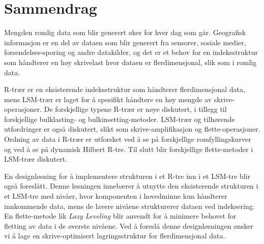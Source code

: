 \chapter*{Sammendrag}

Mengden romlig data som blir generert øker for hver dag som går. Geografisk informasjon er en del av dataen som blir generert fra sensorer, sosiale medier, forsendelses-sporing og andre datakilder, og det er et behov for en indeksstruktur som håndterer en høy skrivelast hvor dataen er flerdimensjonal, slik som i romlig data.\newline

\noindent
R-trær er en eksisterende indeksstruktur som håndterer flerdimensjonal data, mens LSM-trær er laget for å spesifikt håndtere en høy mengde av skrive-operasjoner. De forskjellige typene R-trær er nøye diskutert, i tillegg til forskjellige bulklasting- og bulkinsetting-metoder. LSM-trær og tilhørende utfordringer er også diskutert, slikt som skrive-amplifikasjon og flette-operasjoner. Ordning av data i R-trær er utforsket ved å se på forskjellige romfyllingskurver og ved å se på dynamisk Hilbert R-tre. Til slutt blir forskjellige flette-metoder i LSM-trær diskutert.\newline

\noindent
En designløsning for å implementere strukturen i et R-tre inn i et LSM-tre blir også foreslått. Denne løsningen innebærer å utnytte den eksisterende strukturen i et LSM-tre med nivåer, hvor komponenten i hovedminne kun håndterer innkommende data, mens de lavere nivåene strukturerer dataen ved indeksering. En flette-metode lik \emph{Lazy Leveling} blir anvendt for å minimere behovet for fletting av data i de øverste nivåene. Ved å foreslå denne designløsningen ønsker vi å lage en skrive-optimisert lagringsstruktur for flerdimensjonal data. 
